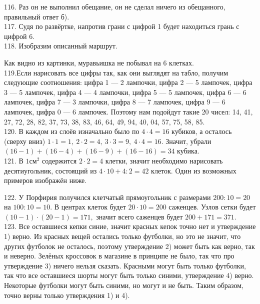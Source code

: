 116. Раз он не выполнил обещание, он не сделал ничего из обещанного, правильный ответ б).\\
117. Судя по развёртке, напротив грани с цифрой 1 будет находиться грань с цифрой 6.\\
118. Изобразим описанный маршрут.
\begin{center}
\begin{figure}[ht!]
\end{figure}
\end{center}
Как видно из картинки, муравьишка не побывал на 6 клетках.\\
119.Если нарисовать все цифры так, как они выглядят на табло, получим следующие соотношения: цифра 1 --- 2 лампочки, цифра 2 --- 5 лампочек, цифра 3 --- 5 лампочек, цифра 4 --- 4 лампочки, цифра 5 --- 5 лампочек, цифра 6 --- 6 лампочек, цифра 7 --- 3 лампочки, цифра 8 --- 7 лампочек, цифра 9 --- 6 лампочек, цифра 0 --- 6 лампочек. Поэтому нам подойдут такие 20 чисел: 14, 41, 27, 72, 28, 82, 37, 73, 38, 83, 46, 64, 49, 94, 40, 04, 57, 75, 58, 85.\\
120. В каждом из слоёв изначально было по $4\cdot4=16$ кубиков, а осталось (сверху вниз) $1\cdot1=1,\ 2\cdot2=4,\ 3\cdot3=9,\ 4\cdot4=16.$ Значит, убрали $(16-1)+(16-4)+(16-9)+(16-16)=34$ кубика.\\
121. В $1\text{см}^2$ содержится $2\cdot2=4$ клетки, значит необходимо нарисовать десятиугольник, состоящий из $4\cdot10+4:2=42$ клеток. Один из возможных примеров изображён ниже.
\begin{center}
\begin{figure}[ht!]
\end{figure}
\end{center}
122. У Порфирия получился клетчатый прямоугольник с размерами $200:10=20$ на $100:10=10.$ В центрах клеток будет $20\cdot10=200$ саженцев. Узлов сетки будет $(10-1)\cdot(20-1)=171,$ значит всего саженцев будет $200+171=371.$\\
123. Все оставшиеся кепки синие, значит красных кепок точно нет и утверждение 1) верно. Из красных вещей остались только футболки, но это не значит, что других футболок не осталось, поэтому утверждение 2) может быть как верно, так и неверно. Зелёных кроссовок в магазине в принципе не было, так что про утверждение 3) ничего нельзя сказать. Красными могут быть только футболки, так что все оставшиеся шорты могут быть только синими, утверждение 4) верно. Некоторые футболки могут быть синими, но могут и не быть. Таким образом, точно верны только утверждения 1) и 4).\\
